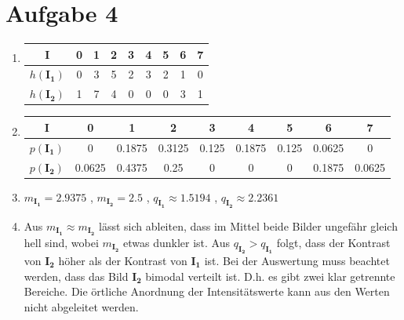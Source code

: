 \documentclass[deutsch]{llncs}
\begin{document}
\section*{Aufgabe 4}
\begin{enumerate}
	\setlength\itemsep{1em}
	\item
	      \begin{tabular}{ |c| c c c c c c c c| }
		      \hline
		      $\mathbf{I}$      & 0 & 1 & 2 & 3 & 4 & 5 & 6 & 7 \\
		      \hline
		      $h(\mathbf{I_1})$ & 0 & 3 & 5 & 2 & 3 & 2 & 1 & 0 \\
		      \hline
		      $h(\mathbf{I_2})$ & 1 & 7 & 4 & 0 & 0 & 0 & 3 & 1 \\
		      \hline
	      \end{tabular}

	\item
	      \begin{tabular}{ |c| c c c c c c c c| }
		      \hline
		      $\mathbf{I}$      & 0      & 1      & 2      & 3     & 4      & 5     & 6      & 7      \\
		      \hline
		      $p(\mathbf{I_1})$ & 0      & 0.1875 & 0.3125 & 0.125 & 0.1875 & 0.125 & 0.0625 & 0      \\
		      \hline
		      $p(\mathbf{I_2})$ & 0.0625 & 0.4375 & 0.25   & 0     & 0      & 0     & 0.1875 & 0.0625 \\
		      \hline
	      \end{tabular}

	\item $m_{\mathbf{I_1}}=2.9375$
	      , $m_{\mathbf{I_2}}=2.5$
	      , $q_{\mathbf{I_1}}\approx 1.5194$
	      , $q_{\mathbf{I_2}}\approx 2.2361$

	\item Aus $m_{\mathbf{I_1}} \approx m_{\mathbf{I_2}}$ lässt sich ableiten,
	      dass im Mittel beide Bilder ungefähr gleich hell sind, wobei $m_{\mathbf{I_2}}$ etwas dunkler ist.
	      Aus $q_{\mathbf{I_2}} > q_{\mathbf{I_1}}$ folgt,
	      dass der Kontrast von $\mathbf{I_2}$ höher als der Kontrast von $\mathbf{I_1}$ ist.
	      Bei der Auswertung muss beachtet werden, dass das Bild $\mathbf{I_2}$ bimodal verteilt ist. D.h. es gibt zwei klar getrennte Bereiche.
	      Die örtliche Anordnung der Intensitätswerte kann aus den Werten nicht abgeleitet werden.

\end{enumerate}
\end{document}
